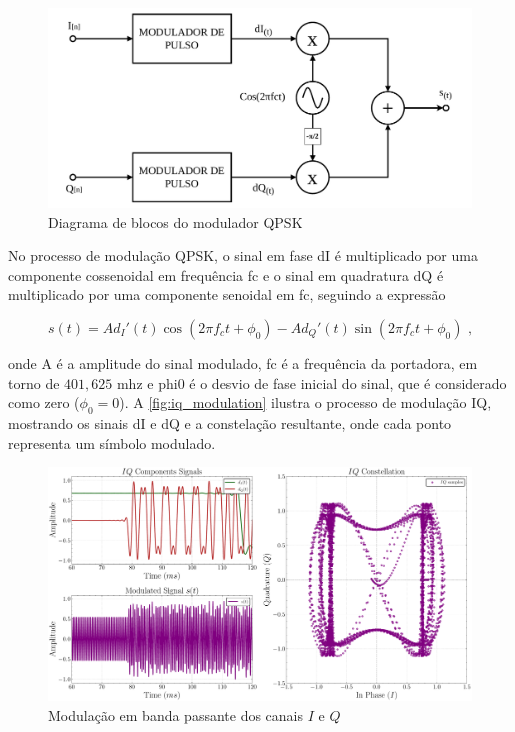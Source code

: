 \begin{figure}[H]
	\centering
	\caption{Diagrama de blocos do modulador QPSK}\label{fig:qpsk_modulator}
	\includegraphics[width=\linewidth]{assets/cap2/qpsk_modulator.pdf}
\end{figure}

No processo de modulação QPSK, o sinal em fase \gls{dI} é multiplicado por uma componente cossenoidal em frequência \gls{fc} e o sinal em quadratura \gls{dQ} é multiplicado por uma componente senoidal em \gls{fc}, seguindo a expressão

\vspace{-0.8em}
\begin{equation}
    s(t) = A d_I'(t) \cos(2\pi f_c t + \phi_0) - Ad_Q'(t) \sin(2\pi f_c t + \phi_0) \text{ ,}
\end{equation}

\noindent onde \gls{A} é a amplitude do sinal modulado, \gls{fc} é a frequência da portadora, em torno de $401,625$ \gls{mhz} e \gls{phi0} é o desvio de fase inicial do sinal, que é considerado como zero ($\phi_0 = 0$). A \autoref{fig:iq_modulation} ilustra o processo de modulação IQ, mostrando os sinais \gls{dI} e \gls{dQ} e a constelação resultante, onde cada ponto representa um símbolo modulado.

\begin{figure}[H]
	\centering
	\caption{Modulação em banda passante dos canais $I$ e $Q$}\label{fig:iq_modulation}
	\includegraphics[width=\linewidth]{assets/cap2/transmitter_modulator_time_comp.pdf}
\end{figure}

